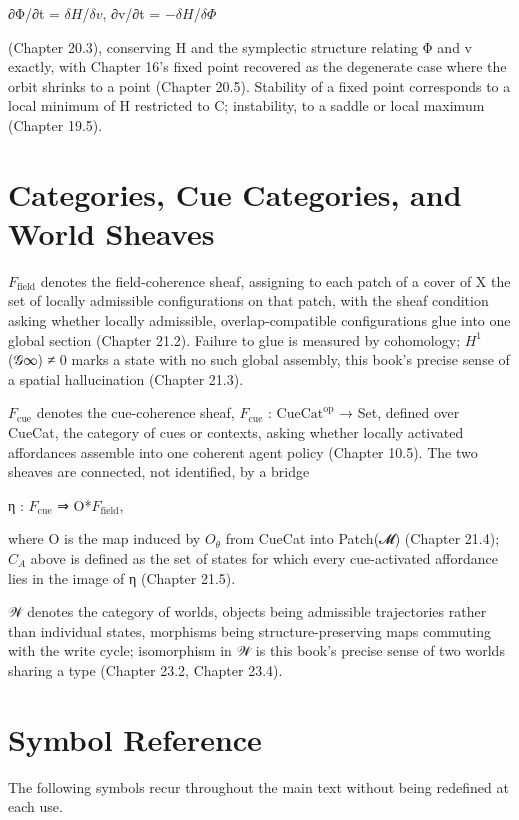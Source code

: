 ∂Φ/∂t = \(\delta H\)/\(\delta v\), ∂v/∂t = −\(\delta H\)/\(\delta \Phi\)

(Chapter 20.3), conserving H and the symplectic structure relating Φ and v exactly, with Chapter 16's fixed point recovered as the degenerate case where the orbit shrinks to a point (Chapter 20.5). Stability of a fixed point corresponds to a local minimum of H restricted to C; instability, to a saddle or local maximum (Chapter 19.5).

\section{Categories, Cue Categories, and World Sheaves}

\(F_{\mathrm{field}}\) denotes the field-coherence sheaf, assigning to each patch of a cover of X the set of locally admissible configurations on that patch, with the sheaf condition asking whether locally admissible, overlap-compatible configurations glue into one global section (Chapter 21.2). Failure to glue is measured by cohomology; \(H^1\)(𝒢∞) ≠ 0 marks a state with no such global assembly, this book's precise sense of a spatial hallucination (Chapter 21.3).

\(F_{\mathrm{cue}}\) denotes the cue-coherence sheaf, \(F_{\mathrm{cue}}\) : \(\mathrm{CueCat}^{\mathrm{op}}\) → Set, defined over CueCat, the category of cues or contexts, asking whether locally activated affordances assemble into one coherent agent policy (Chapter 10.5). The two sheaves are connected, not identified, by a bridge

η : \(F_{\mathrm{cue}}\) ⇒ O*\(F_{\mathrm{field}}\),

where O is the map induced by \(O_\theta\) from CueCat into Patch(𝓜) (Chapter 21.4); \(C_A\) above is defined as the set of states for which every cue-activated affordance lies in the image of η (Chapter 21.5).

𝒲 denotes the category of worlds, objects being admissible trajectories rather than individual states, morphisms being structure-preserving maps commuting with the write cycle; isomorphism in 𝒲 is this book's precise sense of two worlds sharing a type (Chapter 23.2, Chapter 23.4).

\section{Symbol Reference}

The following symbols recur throughout the main text without being redefined at each use.

